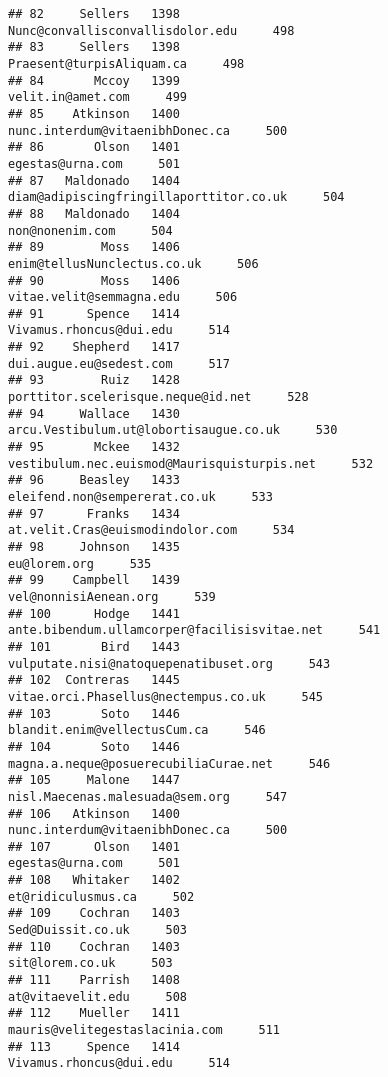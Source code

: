 \documentclass[
]{article}
\begin{document}
\begin{verbatim}
## 82     Sellers   1398                  Nunc@convallisconvallisdolor.edu     498
## 83     Sellers   1398                         Praesent@turpisAliquam.ca     498
## 84       Mccoy   1399                                 velit.in@amet.com     499
## 85    Atkinson   1400                   nunc.interdum@vitaenibhDonec.ca     500
## 86       Olson   1401                                  egestas@urna.com     501
## 87   Maldonado   1404           diam@adipiscingfringillaporttitor.co.uk     504
## 88   Maldonado   1404                                   non@nonenim.com     504
## 89        Moss   1406                       enim@tellusNunclectus.co.uk     506
## 90        Moss   1406                          vitae.velit@semmagna.edu     506
## 91      Spence   1414                           Vivamus.rhoncus@dui.edu     514
## 92    Shepherd   1417                           dui.augue.eu@sedest.com     517
## 93        Ruiz   1428                porttitor.scelerisque.neque@id.net     528
## 94     Wallace   1430            arcu.Vestibulum.ut@lobortisaugue.co.uk     530
## 95       Mckee   1432       vestibulum.nec.euismod@Maurisquisturpis.net     532
## 96     Beasley   1433                     eleifend.non@sempererat.co.uk     533
## 97      Franks   1434                  at.velit.Cras@euismodindolor.com     534
## 98     Johnson   1435                                      eu@lorem.org     535
## 99    Campbell   1439                             vel@nonnisiAenean.org     539
## 100      Hodge   1441      ante.bibendum.ullamcorper@facilisisvitae.net     541
## 101       Bird   1443             vulputate.nisi@natoquepenatibuset.org     543
## 102  Contreras   1445              vitae.orci.Phasellus@nectempus.co.uk     545
## 103       Soto   1446                      blandit.enim@vellectusCum.ca     546
## 104       Soto   1446             magna.a.neque@posuerecubiliaCurae.net     546
## 105     Malone   1447                   nisl.Maecenas.malesuada@sem.org     547
## 106   Atkinson   1400                   nunc.interdum@vitaenibhDonec.ca     500
## 107      Olson   1401                                  egestas@urna.com     501
## 108   Whitaker   1402                                et@ridiculusmus.ca     502
## 109    Cochran   1403                                 Sed@Duissit.co.uk     503
## 110    Cochran   1403                                   sit@lorem.co.uk     503
## 111    Parrish   1408                                 at@vitaevelit.edu     508
## 112    Mueller   1411                    mauris@velitegestaslacinia.com     511
## 113     Spence   1414                           Vivamus.rhoncus@dui.edu     514

\end{verbatim}
\end{document}
